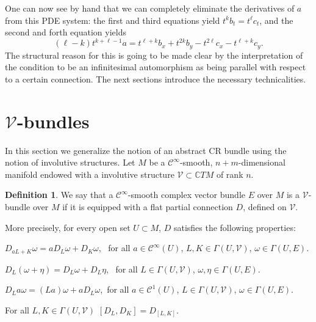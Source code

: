 \documentclass[11pt]{amsart}
\newcommand{\crb}{\mathcal{V}}
\newcommand{\diffable}[1]{\mathcal{C}^{#1}}
\theoremstyle{definition}
\newtheorem{defn}{Definition}[section]
\theoremstyle{remark}
\theoremstyle{plain}
\begin{document}
One can now see by hand that we can completely eliminate the
derivatives of $a$ from this PDE system: the first and third equations yield $t^k b_t = t^\ell c_t$,
and the second and forth equation yields
\[ (\ell -  k )t^{k+\ell -1} a = t^{\ell + k} b_x + t^{2 k} b_y - t^{2\ell} c_x - t^{\ell + k} c_y.   \]
The structural reason for this is going to be made clear by the interpretation of the
condition to be an infinitesimal automorphism as being parallel with respect to a certain connection. The next sections introduce the necessary technicalities.

%
\section{$\mathcal{V}$-bundles}\label{sec:V_bundles}
%
%
In this section we generalize the notion of an abstract CR
bundle using the notion of involutive structures. Let $M$ be a
$\mathcal{C}^\infty$-smooth, $n+m$-dimensional manifold endowed with a
involutive structure $\mathcal{V}\subset \mathbb{C}TM$ of rank
$n$.
%
\begin{defn}
  We say that a $\mathcal{C}^\infty$-smooth complex vector bundle $E$
  over $M$ is a $\mathcal{V}$-bundle over $M$ if it is
  equipped with a flat partial connection $D$, defined on
  $\mathcal{V}$.

  More precisely, for every open set $U \subset M$, $D$ satisfies
  the following properties:
  \begin{compactenum}[\rm i)]
  \item $D_{a L + K} \omega = a D_{L} \omega + D_{K} \omega$, \, for
    all $a \in \diffable{\infty}(U)$,
    $L, K \in \Gamma (U, \mathcal{V})$, $\omega\in \Gamma (U,E)$.
  \item $D_{L} (\omega + \eta) = D_{L} \omega + D_{L}\eta $, \, for
    all $L \in \Gamma (U, \mathcal{V})$,
    $\omega, \eta\in \Gamma (U,E)$.
  \item $D_{L} a \omega = (L a) \omega + a D_{L} \omega$,\, for all
    $a \in \diffable{1}(U)$, $L \in \Gamma (U, \mathcal{V})$,
    $\omega\in \Gamma (U,E)$.
  \item For all $L, K \in \Gamma(U, \mathcal{V})$
    $[D_{L}, D_{K} ] = D_{[L, K]} $.
  \end{compactenum}
\end{defn}
\end{document}
